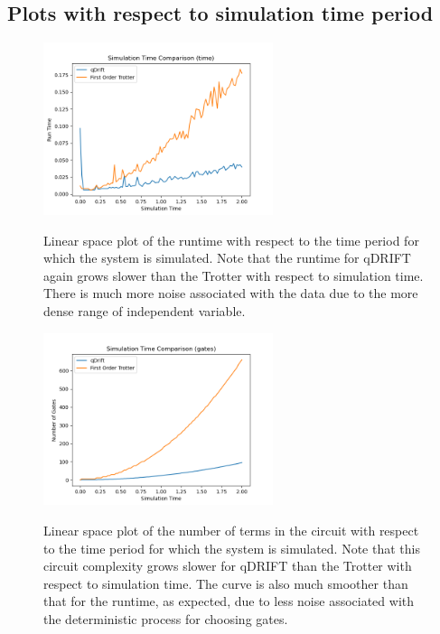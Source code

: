 \documentclass[letterpaper, 11pt]{article}
\begin{document}
\subsection*{Plots with respect to simulation time period}
\begin{figure}[H]
\centering
\includegraphics[width = 0.6\textwidth]{plots/sim_time_time_comp.png}
\label{html}
\caption{Linear space plot of the runtime with respect to the time period for which the system is simulated. Note that the runtime for qDRIFT again grows slower than the Trotter with respect to simulation time. There is much more noise associated with the data due to the more dense range of independent variable.}
\end{figure}
\begin{figure}[H]
\centering
\includegraphics[width = 0.6\textwidth]{plots/sim_time_gates_comp.png}
\label{html}
\caption{Linear space plot of the number of terms in the circuit with respect to the time period for which the system is simulated. Note that this circuit complexity grows slower for qDRIFT than the Trotter with respect to simulation time. The curve is also much smoother than that for the runtime, as expected, due to less noise associated with the deterministic process for choosing gates.}
\end{figure}


\end{document}
